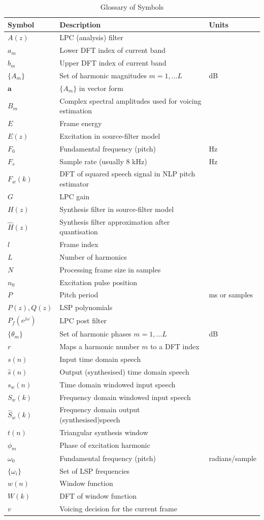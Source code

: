 \documentclass{article}
\begin{document}
{\begin{table}[H]
\label{tab:symbol_glossary}
\centering
\begin{tabular}{l l l }
\hline
Symbol & Description & Units \\
\hline
$A(z)$ & LPC (analysis) filter \\
$a_m$ & Lower DFT index of current band \\
$b_m$ & Upper DFT index of current band \\
$\{A_m\}$ & Set of harmonic magnitudes $m=1,...L$ & dB \\
$\mathbf{a}$ & $\{A_m\}$ in vector form \\
$B_m$ & Complex spectral amplitudes used for voicing estimation \\
$E$ & Frame energy \\
$E(z)$ & Excitation in source-filter model \\
$F_0$ & Fundamental frequency (pitch) & Hz \\
$F_s$ & Sample rate (usually 8 kHz) & Hz \\
$F_w(k)$ & DFT of squared speech signal in NLP pitch estimator \\
$G$ & LPC gain \\
$H(z)$ & Synthesis filter in source-filter model \\
$\hat{H}(z)$ & Synthesis filter approximation after quantisation \\
$l$ & Frame index \\
$L$ & Number of harmonics \\
$N$ & Processing frame size in samples \\
$n_0$ & Excitation pulse position \\
$P$ & Pitch period & ms or samples \\
$P(z), Q(z)$ & LSP polynomials \\
$P_f(e^{j \omega})$ & LPC post filter \\
$\{\theta_m\}$ & Set of harmonic phases $m=1,...L$ & dB \\
$r$ & Maps a harmonic number $m$ to a DFT index \\
$s(n)$ & Input time domain speech \\
$\hat{s}(n)$ & Output (synthesised) time domain speech \\
$s_w(n)$ & Time domain windowed input speech \\
$S_w(k)$ & Frequency domain windowed input speech \\
$\hat{S}_w(k)$ & Frequency domain output (synthesised)speech \\
$t(n)$ & Triangular synthesis window \\
$\phi_m$ & Phase of excitation harmonic \\
$\omega_0$ & Fundamental frequency (pitch) & radians/sample \\
$\{\omega_i\}$ & Set of LSP frequencies \\
$w(n)$ & Window function \\
$W(k)$ & DFT of window function \\
$v$ & Voicing decision for the current frame \\
\hline
\end{tabular}
\caption{Glossary of Symbols}
\end{table}

}
\end{document}
